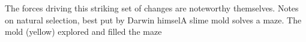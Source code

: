 \documentclass{tufte-book}
\begin{document}
The forces driving this striking set of changes are noteworthy themselves.
Notes on natural selection, best put by Darwin himselA slime mold solves a maze.  The mold (yellow) explored and filled the maze



\end{document}
